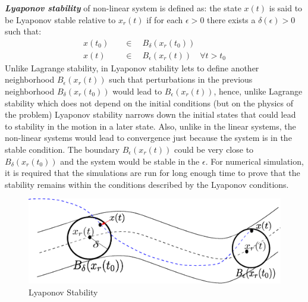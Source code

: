 \textbf{\textit{Lyaponov stability}} of non-linear system is defined as: the state $x(t)$ is said to be Lyaponov stable relative to $x_r(t)$ if for each $\epsilon > 0$ there exists a $\delta(\epsilon)>0$ such that:
\begin{align}
x(t_0) \quad &\in \quad B_{\delta}(x_r(t_0)) \\
x(t) \quad &\in \quad B_{\epsilon}(x_r(t)) \quad \forall t > t_0
\end{align}
Unlike Lagrange stability, in Lyaponov stability lets to define another neighborhood $B_{\epsilon}(x_r(t))$ such that perturbations in the previous neighborhood $B_{\delta}(x_r(t_0))$ would lead to $B_{\epsilon}(x_r(t))$, hence, unlike Lagrange stability which does not depend on the initial conditions (but on the physics of the problem) Lyaponov stability narrows down the initial states that could lead to stability in the motion in a later state. Also, unlike in the linear systems, the non-linear systems would lead to convergence just because the system is in the stable condition. The boundary $B_{\epsilon}(x_r(t))$ could be very close to $B_{\delta}(x_r(t_0))$ and the system would be stable in the $\epsilon$. For numerical simulation, it is required that the simulations are run for long enough time to prove that the stability remains within the conditions described by the Lyaponov conditions.

\begin{figure}[h!]
	\centering
	\includegraphics[scale=0.5]{Bilder/LyaponovStability.eps}
	\caption{Lyaponov Stability}
	\label{fig:LyaponovStability}
\end{figure}

